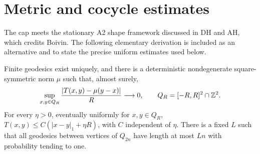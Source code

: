 \section{Metric and cocycle estimates}\label{sec:metric}
The cap meets the stationary A2 shape framework discussed in DH and AH,
which credits Boivin. The following elementary derivation is included as
an alternative and to state the precise uniform estimates used below.

\begin{lemma}\label{lem:metric}
Finite geodesics exist uniquely, and there is a deterministic nondegenerate
square-symmetric norm $\mu$ such that, almost surely,
\begin{equation}\label{eq:extended}
 \sup_{x,y\in Q_R}\frac{|T(x,y)-\mu(y-x)|}{R}\longrightarrow0,
 \qquad Q_R=[-R,R]^2\cap\mathbb Z^2.
\end{equation}
For every $\eta>0$, eventually uniformly for $x,y\in Q_R$,
$T(x,y)\le C(|x-y|_1+\eta R)$, with $C$ independent of $\eta$.
There is a fixed $L$ such that all geodesics between vertices of $Q_{2n}$
have length at most $Ln$ with probability tending to one.
\end{lemma}
